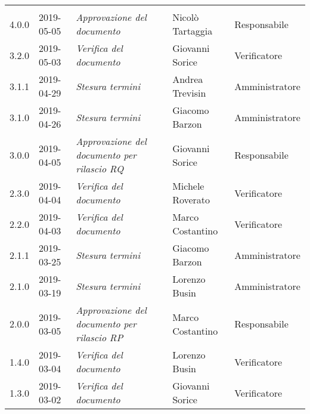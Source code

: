 \newpage 
\section*{}
	\begin{longtable}{C{2cm}|C{2.5cm}|C{4.5cm}|C{2.5cm}|C{3cm}}
		
		 &  &  &  &   \\
		\endhead
		
		4.0.0 & 2019-05-05 & \emph{Approvazione del documento} & Nicolò Tartaggia  & Responsabile \\
		\hline
		
		3.2.0 & 2019-05-03 & \emph{Verifica del documento} & Giovanni Sorice  & Verificatore \\
		\hline
		
		3.1.1 & 2019-04-29 & \emph{Stesura termini} & Andrea Trevisin  & Amministratore \\
		\hline
		
		3.1.0 & 2019-04-26 & \emph{Stesura termini} & Giacomo Barzon  & Amministratore \\
		\hline
		
		3.0.0 & 2019-04-05 & \emph{Approvazione del documento per rilascio RQ} & Giovanni Sorice & Responsabile  \\
		\hline
		
		2.3.0 & 2019-04-04 & \emph{Verifica del documento} & Michele Roverato & Verificatore \\
		\hline
		
		2.2.0 & 2019-04-03 & \emph{Verifica del documento} & Marco Costantino & Verificatore \\
		\hline
		
		2.1.1 & 2019-03-25 & \emph{Stesura termini} & Giacomo Barzon & Amministratore \\
		\hline
		
		2.1.0 & 2019-03-19 & \emph{Stesura termini} & Lorenzo Busin & Amministratore \\
		\hline
	
		2.0.0 & 2019-03-05 & \emph{Approvazione del documento per rilascio RP} & Marco Costantino & Responsabile  \\
		\hline
		
		1.4.0 & 2019-03-04 & \emph{Verifica del documento} & Lorenzo Busin & Verificatore \\
		\hline
		
		1.3.0 & 2019-03-02 & \emph{Verifica del documento} & Giovanni Sorice & Verificatore \\
		\hline
	

\end{longtable}
